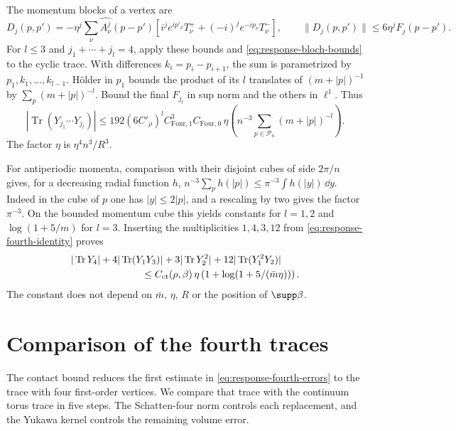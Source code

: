 \documentclass[11pt,letterpaper,reqno]{amsart}
\begin{document}
The momentum blocks of a vertex are
\[
 D_j(p,p')=-\eta^j\sum_\nu\widehat{A_\nu^j}(p-p')
       [i^je^{ip'_\nu}T_\nu^++(-i)^je^{-ip_\nu}T_\nu^-],
 \qquad\|D_j(p,p')\|\le6\eta^jF_j(p-p').
\]
For $l\le3$ and $j_1+\cdots+j_l=4$, apply these bounds
and \eqref{eq:response-bloch-bounds} to the cyclic trace.
With differences $k_i=p_i-p_{i+1}$, the sum is parametrized
by $p_1,k_1,\ldots,k_{l-1}$. H\"older in $p_1$ bounds
the product of its $l$ translates of $(m+|p|)^{-1}$ by
$\sum_p(m+|p|)^{-l}$. Bound the final $F_{j_l}$ in sup
norm and the others in $\ell^1$. Thus
\begin{equation}\label{eq:response-cyclic-contact}
 |\operatorname{Tr}(Y_{j_1}\cdots Y_{j_l})|
   \le192(6C'_\rho)^l C_{\mathrm{Four},1}^3C_{\mathrm{Four},0}\,
          \eta\left(n^{-3}\sum_{p\in\mathcal P_n}(m+|p|)^{-l}\right).
\end{equation}
The factor $\eta$ is $\eta^4n^3/R^3$.

For antiperiodic momenta, comparison with their disjoint
cubes of side $2\pi/n$ gives, for a decreasing radial
function $h$, $n^{-3}\sum_ph(|p|)\le\pi^{-3}\int h(|y|)\,\dd y$.
Indeed in the cube of $p$ one has $|y|\le2|p|$, and a
rescaling by two gives the factor $\pi^{-3}$. On the
bounded momentum cube this yields constants for $l=1,2$
and $\log(1+5/m)$ for $l=3$. Inserting the multiplicities
$1,4,3,12$ from \eqref{eq:response-fourth-identity} proves
\begin{equation}\label{eq:response-contact-bound}
 \begin{split}
 &|\operatorname{Tr}Y_4|+4|\operatorname{Tr}(Y_1Y_3)|
          +3|\operatorname{Tr}Y_2^2|+12|\operatorname{Tr}(Y_1^2Y_2)|\\
 &\hspace{25mm}\le C_{\mathrm{ct}}(\rho,\beta)\,
               \eta\left(1+\log(1+5/(\bar m\eta))\right).
 \end{split}
\end{equation}
The constant does not depend on $\bar m$, $\eta$, $R$ or
the position of $\supp\beta$.

\section{Comparison of the fourth traces}\label{subsec:response-fourth}

The contact bound reduces the first estimate in
\eqref{eq:response-fourth-errors} to the trace with four first-order
vertices. We compare that trace with the continuum torus trace in
five steps. The Schatten-four norm controls each replacement,
and the Yukawa kernel controls the remaining volume error.
\end{document}
